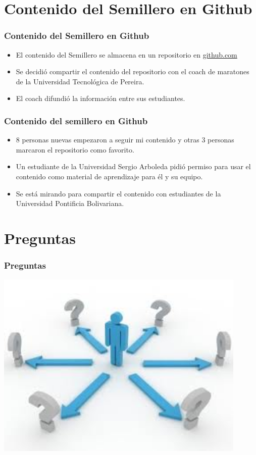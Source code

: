 \documentclass{beamer}
\begin{document}
\section[Contenido en Github]{Contenido del Semillero en Github}
	\begin{frame}
		\frametitle{Contenido del Semillero en Github}
		\begin{itemize}	
			\item El contenido del Semillero se almacena en un repositorio en \url{github.com}
			\item Se decidió compartir el contenido del repositorio con el coach de maratones de la Universidad Tecnológica de Pereira.
			\item El coach difundió la información entre sus estudiantes.
		\end{itemize}
	\end{frame}
	
	\begin{frame}
		\frametitle{Contenido del semillero en Github}
		\begin{itemize}
			\item 8 personas nuevas empezaron a seguir mi contenido y otras 3 personas marcaron el repositorio como favorito.
			\item Un estudiante de la Universidad Sergio Arboleda pidió permiso para usar el contenido como material de aprendizaje para él y su equipo.
			\item Se está mirando para compartir el contenido con estudiantes de la Universidad Pontificia Bolivariana.
		\end{itemize}
	\end{frame}
	
\section[Preguntas]{Preguntas}
	\begin{frame}
		\frametitle{Preguntas}
		\includegraphics[width = 0.9\textwidth]{preguntas.jpeg}
	\end{frame}
\end{document}
